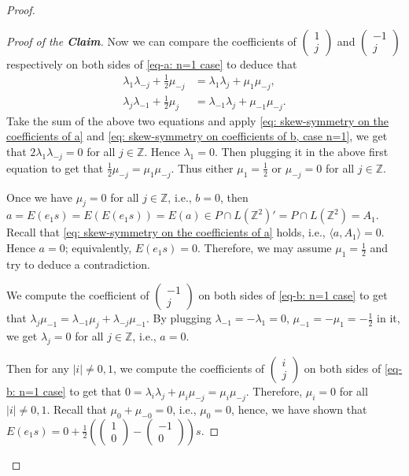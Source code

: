 \documentclass[12pt]{amsart}
\theoremstyle{definition}
\theoremstyle{remark}
\begin{document}
\begin{proof}
\begin{proof}[Proof of the \textbf{Claim}]
Now we can compare the coefficients of $\begin{pmatrix}
1\\
j
\end{pmatrix}$ and $\begin{pmatrix}
-1\\
j
\end{pmatrix}$ respectively on both sides of  \eqref{eq-a: n=1 case} to deduce that
\begin{align*}
\lambda_1\lambda_{-j}+\frac{1}{2}\mu_{-j}&=\lambda_1\lambda_j+\mu_1\mu_{-j},\\
\lambda_j\lambda_{-1}+\frac{1}{2}\mu_j&=\lambda_{-1}\lambda_j+\mu_{-1}\mu_{-j}.
\end{align*}
Take the sum of the above two equations and apply \eqref{eq: skew-symmetry on the coefficients of a} and \eqref{eq: skew-symmetry on coefficients of b, case n=1}, we get that $2\lambda_1\lambda_{-j}=0$ for all $j\in\mathbb{Z}$. Hence $\lambda_1=0$. Then plugging it in the above first equation to get that $\frac{1}{2}\mu_{-j}=\mu_1\mu_{-j}$. Thus either $\mu_1=\frac{1}{2}$ or $\mu_{-j}=0$ for all $j\in \mathbb{Z}$. 

Once we have $\mu_j=0$ for all $j\in\mathbb{Z}$, i.e., $b=0$, then $a=E(e_1s)=E(E(e_1s))=E(a)\in P\cap L(\mathbb{Z}^2)'=P\cap L(\mathbb{Z}^2)=A_1$. Recall that \eqref{eq: skew-symmetry on the coefficients of a} holds, i.e., $\langle a, A_1 \rangle=0$. Hence $a=0$; equivalently, $E(e_1s)=0$.
Therefore, we may assume $\mu_1=\frac{1}{2}$ and try to deduce a contradiction.


We compute the coefficient of $\begin{pmatrix}
-1\\
j
\end{pmatrix}$ on both sides of \eqref{eq-b: n=1 case} to get that
$\lambda_j\mu_{-1}=\lambda_{-1}\mu_j+\lambda_{-j}\mu_{-1}$. By plugging $\lambda_{-1}=-\lambda_1=0$, $\mu_{-1}=-\mu_1=-\frac{1}{2}$ in it, we get $\lambda_j=0$ for all $j\in \mathbb{Z}$, i.e., $a=0$. 

Then for any $|i|\neq 0, 1$, we compute the coefficients of $\begin{pmatrix}
i\\
j
\end{pmatrix}$ on both sides of \eqref{eq-b: n=1 case} to get that
$0=\lambda_i\lambda_j+\mu_i\mu_{-j}=\mu_i\mu_{-j}$. Therefore, $\mu_i=0$ for all $|i|\neq 0, 1$. Recall that $\mu_0+\mu_{-0}=0$, i.e., $\mu_0=0$, hence, we have shown that
$E(e_1s)=0+\frac{1}{2}(\begin{pmatrix}
1\\
0
\end{pmatrix}-\begin{pmatrix}
-1\\
0
\end{pmatrix})s$.


\end{proof}
\end{proof}
\end{document}
